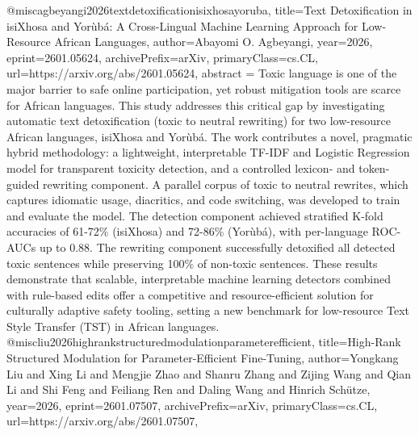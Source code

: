 {}@misc{agbeyangi2026textdetoxificationisixhosayoruba,
      title={Text Detoxification in isiXhosa and Yor\`ub\'a: A Cross-Lingual Machine Learning Approach for Low-Resource African Languages}, 
      author={Abayomi O. Agbeyangi},
      year={2026},
      eprint={2601.05624},
      archivePrefix={arXiv},
      primaryClass={cs.CL},
      url={https://arxiv.org/abs/2601.05624},
      abstract = {Toxic language is one of the major barrier to safe online participation, yet robust mitigation tools are scarce for African languages. This study addresses this critical gap by investigating automatic text detoxification (toxic to neutral rewriting) for two low-resource African languages, isiXhosa and Yorùbá. The work contributes a novel, pragmatic hybrid methodology: a lightweight, interpretable TF-IDF and Logistic Regression model for transparent toxicity detection, and a controlled lexicon- and token-guided rewriting component. A parallel corpus of toxic to neutral rewrites, which captures idiomatic usage, diacritics, and code switching, was developed to train and evaluate the model. The detection component achieved stratified K-fold accuracies of 61-72\% (isiXhosa) and 72-86\% (Yorùbá), with per-language ROC-AUCs up to 0.88. The rewriting component successfully detoxified all detected toxic sentences while preserving 100\% of non-toxic sentences. These results demonstrate that scalable, interpretable machine learning detectors combined with rule-based edits offer a competitive and resource-efficient solution for culturally adaptive safety tooling, setting a new benchmark for low-resource Text Style Transfer (TST) in African languages.}
}@misc{liu2026highrankstructuredmodulationparameterefficient,
      title={High-Rank Structured Modulation for Parameter-Efficient Fine-Tuning}, 
      author={Yongkang Liu and Xing Li and Mengjie Zhao and Shanru Zhang and Zijing Wang and Qian Li and Shi Feng and Feiliang Ren and Daling Wang and Hinrich Schütze},
      year={2026},
      eprint={2601.07507},
      archivePrefix={arXiv},
      primaryClass={cs.CL},
      url={https://arxiv.org/abs/2601.07507},
}
